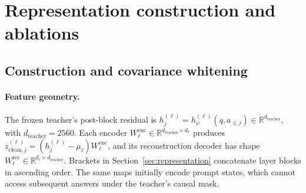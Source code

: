 \documentclass{article}
\newcommand{\R}{\mathbb{R}}
\begin{document}
\clearpage
\section{Representation construction and ablations}
\label{app:representationimplementation}

\subsection{Construction and covariance whitening}
\label{app:representationgeometry}

\paragraph{Feature geometry.}
The frozen teacher's post-block residual is $h_j^{(\ell)}=h_\psi^{(\ell)}(q,a_{\leq j})\in\R^{d_{\mathrm{teacher}}}$, with $d_{\mathrm{teacher}}=2560$. Each encoder $W_\ell^{\mathrm{enc}}\in\R^{d_{\mathrm{teacher}}\times d_\ell}$ produces $z_{\mathrm{clean},j}^{(\ell)}=(h_j^{(\ell)}-\mu_\ell)W_\ell^{\mathrm{enc}}$, and its reconstruction decoder has shape $W_\ell^{\mathrm{rec}}\in\R^{d_\ell\times d_{\mathrm{teacher}}}$. Brackets in Section~\ref{sec:representation} concatenate layer blocks in ascending order. The same maps initially encode prompt states, which cannot access subsequent answers under the teacher's causal mask.
\end{document}
